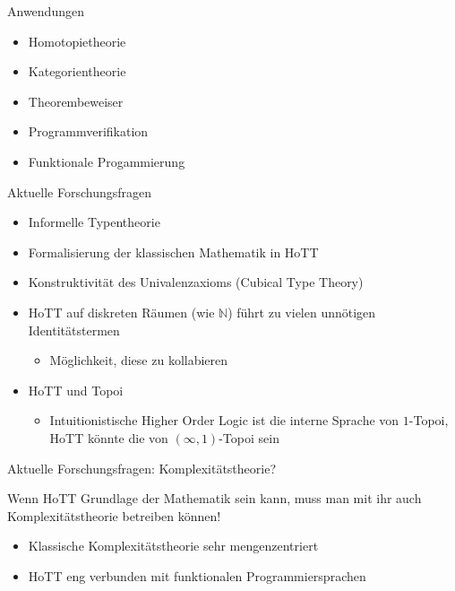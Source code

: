 \documentclass[11pt,aspectratio=169,notheorems]{beamer}
\begin{document}

\begin{frame}{Anwendungen}
    \begin{itemize}
        \item Homotopietheorie
        \item Kategorientheorie
        \item Theorembeweiser
        \item Programmverifikation
        \item Funktionale Progammierung
    \end{itemize}
\end{frame}

\begin{frame}{Aktuelle Forschungsfragen}
    \begin{itemize}
        \item Informelle Typentheorie
        \item Formalisierung der klassischen Mathematik in HoTT
        \item Konstruktivität des Univalenzaxioms (Cubical Type Theory)
        \item HoTT auf diskreten Räumen (wie $\mathbb{N}$) führt zu vielen \glqq{}unnötigen\grqq{} Identitätstermen
        \begin{itemize}
            \item Möglichkeit, diese zu kollabieren
        \end{itemize} 
        \item HoTT und Topoi
        \begin{itemize}
            \item Intuitionistische Higher Order Logic ist die interne Sprache von $1$-Topoi, HoTT könnte die von $(\infty, 1)$-Topoi sein
        \end{itemize}
    \end{itemize}
\end{frame}

\begin{frame}[noframenumbering]{}
    \thispagestyle{empty}
    \begin{center}
        \scalebox{10}{\ucmark}
    \end{center}
\end{frame}

\begin{frame}{Aktuelle Forschungsfragen: Komplexitätstheorie?}
    \begin{simplebox}
        \Large
        \begin{center}
            Wenn HoTT Grundlage der Mathematik sein kann, muss man mit ihr auch Komplexitätstheorie betreiben können!
        \end{center}
    \end{simplebox}
    \begin{itemize}
        \item Klassische Komplexitätstheorie sehr \glqq{}mengenzentriert\grqq{}
        \item HoTT eng verbunden mit funktionalen Programmiersprachen
    \end{itemize}
\end{frame}
\end{document}
